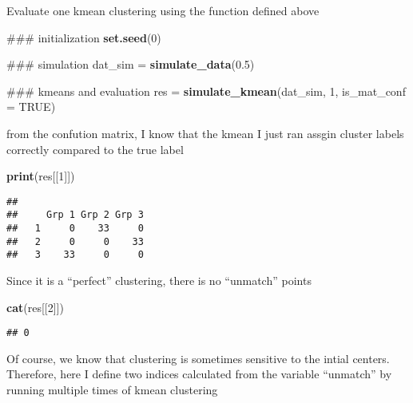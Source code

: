 \documentclass[]{article}
\newenvironment{Shaded}{\begin{snugshade}}{\end{snugshade}}
\newcommand{\KeywordTok}[1]{\textcolor[rgb]{0.13,0.29,0.53}{\textbf{#1}}}
\newcommand{\DataTypeTok}[1]{\textcolor[rgb]{0.13,0.29,0.53}{#1}}
\newcommand{\DecValTok}[1]{\textcolor[rgb]{0.00,0.00,0.81}{#1}}
\newcommand{\FloatTok}[1]{\textcolor[rgb]{0.00,0.00,0.81}{#1}}
\newcommand{\StringTok}[1]{\textcolor[rgb]{0.31,0.60,0.02}{#1}}
\newcommand{\OtherTok}[1]{\textcolor[rgb]{0.56,0.35,0.01}{#1}}
\newcommand{\NormalTok}[1]{#1}
\begin{document}
Evaluate one kmean clustering using the function defined above

\begin{Shaded}
\begin{Highlighting}[]
\NormalTok{### initialization}
\KeywordTok{set.seed}\NormalTok{(}\DecValTok{0}\NormalTok{)}

\NormalTok{### simulation}
\NormalTok{dat_sim =}\StringTok{ }\KeywordTok{simulate_data}\NormalTok{(}\FloatTok{0.5}\NormalTok{)}

\NormalTok{### kmeans and evaluation}
\NormalTok{res =}\StringTok{ }\KeywordTok{simulate_kmean}\NormalTok{(dat_sim, }\DecValTok{1}\NormalTok{, }\DataTypeTok{is_mat_conf =} \OtherTok{TRUE}\NormalTok{)}
\end{Highlighting}
\end{Shaded}

from the confution matrix, I know that the kmean I just ran assgin
cluster labels correctly compared to the true label

\begin{Shaded}
\begin{Highlighting}[]
\KeywordTok{print}\NormalTok{(res[[}\DecValTok{1}\NormalTok{]])}
\end{Highlighting}
\end{Shaded}

\begin{verbatim}
##    
##     Grp 1 Grp 2 Grp 3
##   1     0    33     0
##   2     0     0    33
##   3    33     0     0
\end{verbatim}

Since it is a ``perfect'' clustering, there is no ``unmatch'' points

\begin{Shaded}
\begin{Highlighting}[]
\KeywordTok{cat}\NormalTok{(res[[}\DecValTok{2}\NormalTok{]])}
\end{Highlighting}
\end{Shaded}

\begin{verbatim}
## 0
\end{verbatim}

Of course, we know that clustering is sometimes sensitive to the intial
centers. Therefore, here I define two indices calculated from the
variable ``unmatch'' by running multiple times of kmean clustering
\end{document}
